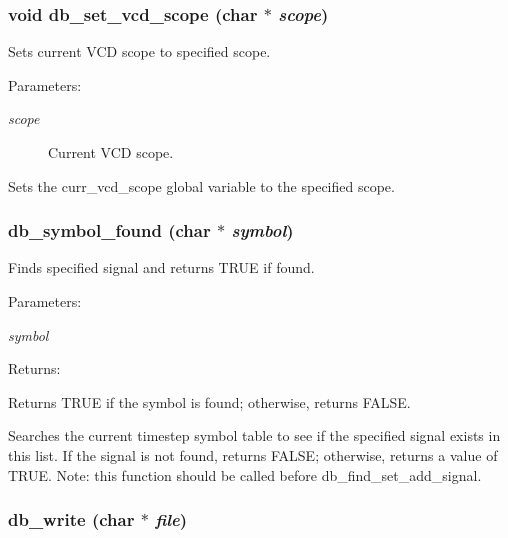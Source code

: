 \subsubsection{\setlength{\rightskip}{0pt plus 5cm}void db\_\-set\_\-vcd\_\-scope (char $\ast$ {\em scope})}\label{db_8h_a8}


Sets current VCD scope to specified scope.

\begin{Desc}
\item[Parameters: ]\par
\begin{description}
\item[{\em 
scope}]Current VCD scope.\end{description}
\end{Desc}
Sets the curr\_\-vcd\_\-scope global variable to the specified scope. 
\subsubsection{ db\_\-symbol\_\-found (char $\ast$ {\em symbol})}\label{db_8h_a10}


Finds specified signal and returns TRUE if found.

\begin{Desc}
\item[Parameters: ]\par
\begin{description}
\item[{\em 
symbol}]\end{description}
\end{Desc}
\begin{Desc}
\item[Returns: ]\par
Returns TRUE if the symbol is found; otherwise, returns FALSE.\end{Desc}
Searches the current timestep symbol table to see if the specified signal exists in this list. If the signal is not found, returns FALSE; otherwise, returns a value of TRUE. Note: this function should be called before db\_\-find\_\-set\_\-add\_\-signal. 
\subsubsection{ db\_\-write (char $\ast$ {\em file})}\label{db_8h_a0}


